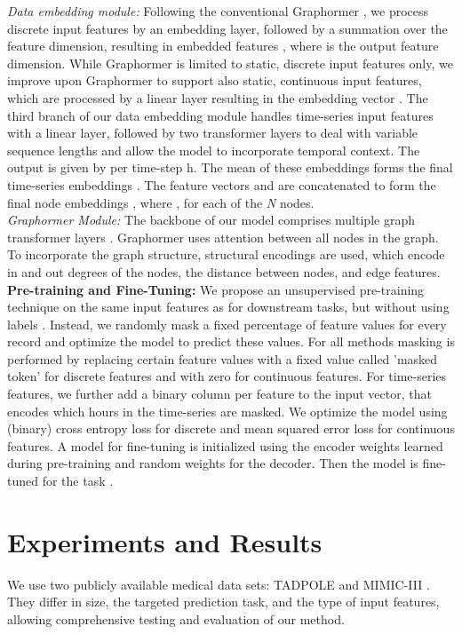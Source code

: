 \documentclass[runningheads]{llncs}
\begin{document}
\noindent \textit{Data embedding module:} Following the conventional Graphormer \cite{graphormer}, we process discrete input features by an embedding layer, followed by a summation over the feature dimension, resulting in embedded features , where  is the output feature dimension. While Graphormer is limited to static, discrete input features only, we improve upon Graphormer to support also static, continuous input features, which are processed by a linear layer resulting in the embedding vector . The third branch of our data embedding module handles time-series input features  with a linear layer, followed by two transformer layers to deal with variable sequence lengths and allow the model to incorporate temporal context. The output is given by  per time-step h.
The mean of these embeddings forms the final time-series embeddings . The feature vectors  and  are concatenated to form the final node embeddings , where , for each of the \textit{N} nodes.\\
\textit{Graphormer Module:} The backbone of our model comprises multiple graph transformer layers \cite{graphormer}. Graphormer uses attention between all nodes in the graph. To incorporate the graph structure, structural encodings are used, which encode in and out degrees of the nodes, the distance between nodes, and edge features.\\ 
\textbf{Pre-training and Fine-Tuning:} We propose an unsupervised pre-training technique on the same input features as for downstream tasks, but without using labels . Instead, we randomly mask a fixed percentage of feature values for every record  and optimize the model to predict these values.  For all methods masking is performed by replacing certain feature values with a fixed value called 'masked token' for discrete features and with zero for continuous features. For time-series features, we further add a binary column per feature to the input vector, that encodes which hours in the time-series are masked. We optimize the model using (binary) cross entropy loss for discrete and mean squared error loss for continuous features. A model for fine-tuning is initialized using the encoder weights learned during pre-training and random weights for the decoder. Then the model is fine-tuned for the task .\\
 \section{Experiments and Results}
We use two publicly available medical data sets: TADPOLE \cite{tadpole} and MIMIC-III \cite{mimic}. They differ in size, the targeted prediction task, and the type of input features, allowing comprehensive testing and evaluation of our method.
\end{document}
